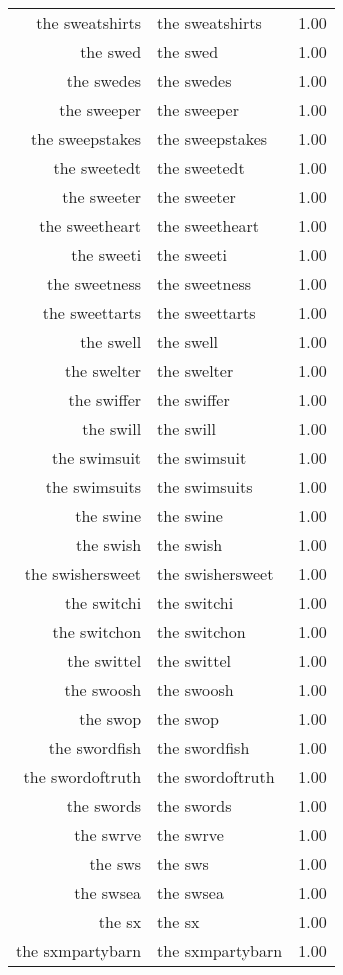 \begin{table}[ht]
\begin{tabular}{rlr}
  the sweatshirts & the sweatshirts & 1.00 \\ 
  the swed & the swed & 1.00 \\ 
  the swedes & the swedes & 1.00 \\ 
  the sweeper & the sweeper & 1.00 \\ 
  the sweepstakes & the sweepstakes & 1.00 \\ 
  the sweetedt & the sweetedt & 1.00 \\ 
  the sweeter & the sweeter & 1.00 \\ 
  the sweetheart & the sweetheart & 1.00 \\ 
  the sweeti & the sweeti & 1.00 \\ 
  the sweetness & the sweetness & 1.00 \\ 
  the sweettarts & the sweettarts & 1.00 \\ 
  the swell & the swell & 1.00 \\ 
  the swelter & the swelter & 1.00 \\ 
  the swiffer & the swiffer & 1.00 \\ 
  the swill & the swill & 1.00 \\ 
  the swimsuit & the swimsuit & 1.00 \\ 
  the swimsuits & the swimsuits & 1.00 \\ 
  the swine & the swine & 1.00 \\ 
  the swish & the swish & 1.00 \\ 
  the swishersweet & the swishersweet & 1.00 \\ 
  the switchi & the switchi & 1.00 \\ 
  the switchon & the switchon & 1.00 \\ 
  the swittel & the swittel & 1.00 \\ 
  the swoosh & the swoosh & 1.00 \\ 
  the swop & the swop & 1.00 \\ 
  the swordfish & the swordfish & 1.00 \\ 
  the swordoftruth & the swordoftruth & 1.00 \\ 
  the swords & the swords & 1.00 \\ 
  the swrve & the swrve & 1.00 \\ 
  the sws & the sws & 1.00 \\ 
  the swsea & the swsea & 1.00 \\ 
  the sx & the sx & 1.00 \\ 
  the sxmpartybarn & the sxmpartybarn & 1.00 \\ 

\end{tabular}
\end{table}
